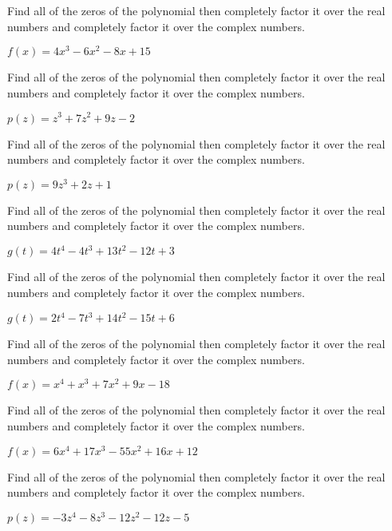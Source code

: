 \documentclass{ximera}
\begin{document}
\begin{problem}
Find all of the zeros of the polynomial then completely factor it over the real numbers and completely factor it over the complex numbers.

$f(x) = 4x^3-6x^2-8x+15$
\end{problem}

\begin{problem}
Find all of the zeros of the polynomial then completely factor it over the real numbers and completely factor it over the complex numbers.

$p(z) = z^3 + 7z^2+9z-2$
\end{problem}

\begin{problem}
Find all of the zeros of the polynomial then completely factor it over the real numbers and completely factor it over the complex numbers.

$p(z) = 9z^3+2z+1$
\end{problem}

\begin{problem}
Find all of the zeros of the polynomial then completely factor it over the real numbers and completely factor it over the complex numbers.

$g(t) = 4t^{4} - 4t^{3} + 13t^{2} - 12t + 3$
\end{problem}

\begin{problem}
Find all of the zeros of the polynomial then completely factor it over the real numbers and completely factor it over the complex numbers.

$g(t) = 2t^4-7t^3+14t^2-15t+6$
\end{problem}

\begin{problem}
Find all of the zeros of the polynomial then completely factor it over the real numbers and completely factor it over the complex numbers.

$f(x) = x^4+x^3+7x^2+9x-18$
\end{problem}

\begin{problem}
Find all of the zeros of the polynomial then completely factor it over the real numbers and completely factor it over the complex numbers.

$f(x) = 6x^4+17x^3-55x^2+16x+12$
\end{problem}

\begin{problem}
Find all of the zeros of the polynomial then completely factor it over the real numbers and completely factor it over the complex numbers.

$p(z) = -3z^4-8z^3-12z^2-12z-5$
\end{problem}
\end{document}
